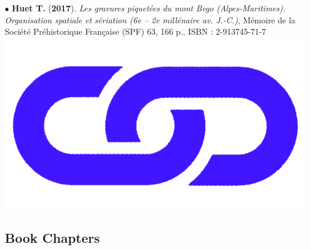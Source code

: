 \documentclass{article}
\newcommand{\fr}[1]{} %
\newcommand{\en}[1]{#1}   %
\begin{document}
{\smallbreak
$\bullet$ \textbf{Huet T.} (\textbf{2017}). \textit{Les gravures piquet\'{e}es du mont Bego (Alpes-Maritimes). Organisation spatiale et s\'{e}riation (6e -- 2e mill\'{e}naire av. J.-C.)}, M\'{e}moire de la Soci\'{e}t\'{e} Pr\'{e}historique Fran\c{c}aise (SPF) 63, 166 p., ISBN : 2-913745-71-7 \href{http://www.prehistoire.org/shop_515-40342-0-0/m63-2017-les-gravures-piquetees-du-mont-bego-alpes-maritimes-organisation-spatiale-et-seriation-vie-iie-millenaire-av.-j.-c.-t.-huet.html}{\includegraphics[scale=0.02]{link_darkblue.png}}

\bigbreak

\subsection*{\fr{Ouvrages (chapitres d')}\en{Book Chapters}}

}
\end{document}
